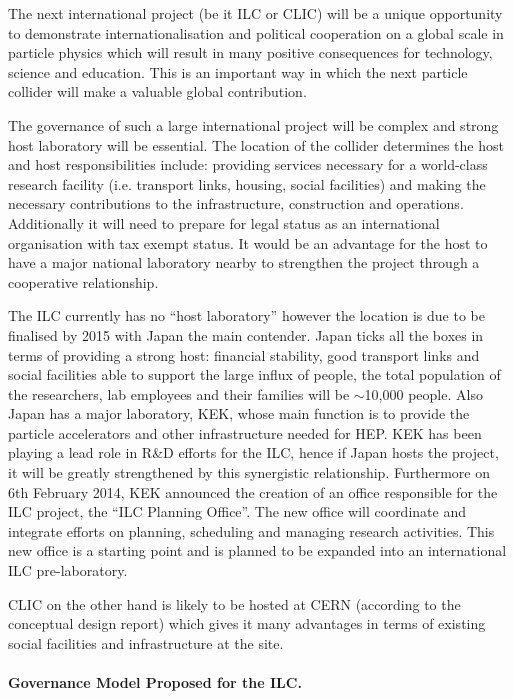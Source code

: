 The next international project (be it ILC or CLIC) will be a unique opportunity to demonstrate internationalisation and political cooperation on a global scale in particle physics which will result in many positive consequences for technology, science and education. This is an important way in which the next particle collider will make a valuable global contribution.

The governance of such a large international project will be complex and strong host laboratory will be essential. The location of the collider determines the host and host responsibilities include: providing services necessary for a world-class research facility (i.e. transport links, housing, social facilities) and making the necessary contributions to the infrastructure, construction and operations. Additionally it will need to prepare for legal status as an international organisation with tax exempt status. It would be an advantage for the host to have a major national laboratory nearby to strengthen the project through a cooperative relationship.

The ILC currently has no ``host laboratory'' however the location is due to be finalised by 2015 with Japan the main contender. Japan ticks all the boxes in terms of providing a strong host: financial stability, good transport links and social facilities able to support the large influx of people, the total population of the researchers, lab employees and their families will be $\sim$10,000 people. Also Japan has a major laboratory, KEK, whose main function is to provide the particle accelerators and other infrastructure needed for HEP. KEK has been playing a lead role in R\&D efforts for the ILC, hence if Japan hosts the project, it will be greatly strengthened by this synergistic relationship. Furthermore on 6th February 2014, KEK announced the creation of an office responsible for the ILC project, the ``ILC Planning Office''. The new office will coordinate and integrate efforts on planning, scheduling and managing research activities. This new office is a starting point and is planned to be expanded into an international ILC pre-laboratory. \cite{LCC:Press2}

CLIC on the other hand is likely to be hosted at CERN (according to the conceptual design report) which gives it many advantages in terms of existing social facilities and infrastructure at the site.

\paragraph{Governance Model Proposed for the ILC.}

